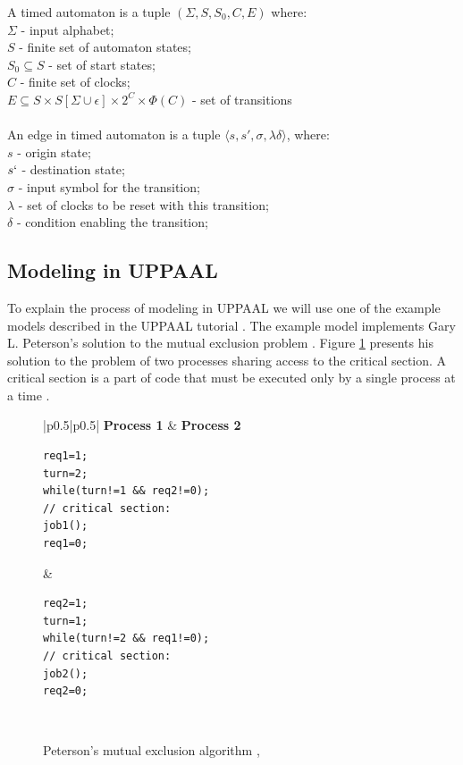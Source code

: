 \newpage
\begin{definition}
A timed automaton is a tuple $(\Sigma, S, S_0, C, E)$ where:\\
$\Sigma$ - input alphabet;\\
$S$ - finite set of automaton states;\\
$S_0 \subseteq S$ - set of start states; \\
$C$ - finite set of clocks; \\
$E \subseteq S \times S [\Sigma \cup {\epsilon}] \times 2^C \times \Phi(C)$ - set of transitions\\\\
An edge in timed automaton is a tuple $\langle s, s', \sigma, \lambda \delta \rangle$, where:\\
$s$ - origin state;\\
$s`$ - destination state;\\
$\sigma$ - input symbol for the transition;\\
$\lambda$ - set of clocks to be reset with this transition;\\
$\delta$ - condition enabling the transition;\\
\label{def:automaton}
\end{definition}


\subsection{Modeling in UPPAAL}
To explain the process of modeling in UPPAAL we will use one of the example models described in the UPPAAL tutorial \cite{SmallTutorial2009}. The example model implements Gary L. Peterson's solution to the mutual exclusion problem \cite{Peterson1981}. Figure \ref{fig:mutex_code} presents his solution to the problem of two processes sharing access to the critical section. A critical section is a part of code that must be executed only by a single process at a time \cite{Raynal2012}.

\begin{figure}[H]
\caption{Peterson’s mutual exclusion algorithm 
\label{fig:mutex_code}
\cite{SmallTutorial2009}, \cite{Peterson1981}}
\begin{tabular}{|p{}|p{}|}
\hline
\textbf{Process 1} & \textbf{Process 2} \\
\hline
\begin{lstlisting}[basicstyle=\ttfamily]
req1=1;
turn=2;
while(turn!=1 && req2!=0);
// critical section:
job1();
req1=0;
\end{lstlisting}
&
\begin{lstlisting}[basicstyle=\ttfamily]
req2=1;
turn=1;
while(turn!=2 && req1!=0);
// critical section:
job2();
req2=0;
\end{lstlisting}
\\
\hline
\end{tabular}
\end{figure}


